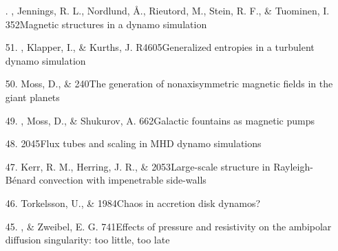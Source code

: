 \begin{itemize}
\item[\important 52.]
\Brandenburg, Jennings, R. L., Nordlund, \AA.,
Rieutord, M., Stein, R. F., \& Tuominen, I.
{352}{Magnetic structures in a dynamo simulation}

\item[51.]
\Brandenburg, Klapper, I., \& Kurths, J.
{R4605}{Generalized entropies in a turbulent dynamo simulation}

\item[50.]
Moss, D., \& \Brandenburg{}
{240}{The generation of nonaxisymmetric magnetic fields in the giant planets}

\item[49.]
\Brandenburg, Moss, D., \& Shukurov, A.
{662}{Galactic fountains as magnetic pumps}

\item[48.]
\Brandenburg{}
{2045}{Flux tubes and scaling in MHD dynamo simulations}

\item[47.]
Kerr, R. M., Herring, J. R., \& \Brandenburg{}
{2053}{Large-scale structure in Rayleigh-B\'enard convection
with impenetrable side-walls}

\item[46.]
Torkelsson, U., \& \Brandenburg{}
{1984}{Chaos in accretion disk dynamos?}

\item[45.]
\Brandenburg, \& Zweibel, E. G.
{741}{Effects of pressure and resistivity on the
ambipolar diffusion singularity: too little, too late}


\end{itemize}
